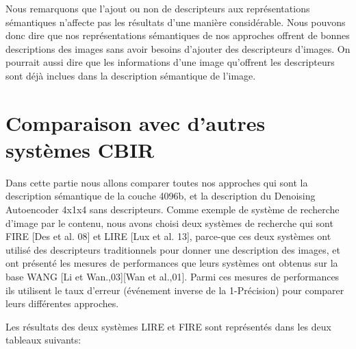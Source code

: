	Nous remarquons que l'ajout ou non de descripteurs aux représentations sémantiques n'affecte pas les résultats d'une manière considérable. Nous pouvons donc dire que nos représentations sémantiques de nos approches offrent de bonnes descriptions des images sans avoir besoins d'ajouter des descripteurs d'images.
On pourrait aussi dire que les informations d'une image qu'offrent les descripteurs sont déjà inclues dans la description sémantique de l'image.

\section{Comparaison avec d'autres systèmes CBIR}

	Dans cette partie nous allons comparer toutes nos approches qui sont la description sémantique de la couche 4096b, et la description du Denoising Autoencoder 4x1x4 sans descripteurs. Comme exemple de système de recherche d'image par le contenu, nous avons choisi deux systèmes de recherche qui sont FIRE [Des et al. 08] et LIRE [Lux et al. 13], parce-que ces deux systèmes ont utilisé des descripteurs traditionnels pour donner une description des images, et ont présenté les mesures de performances que leurs systèmes ont obtenus sur la base WANG [Li et Wan.,03][Wan et al.,01]. Parmi ces mesures de performances ils utilisent le taux d'erreur (événement inverse de la 1-Précision) pour comparer leurs différentes approches.
	
	Les résultats des deux systèmes LIRE et FIRE sont représentés dans les deux tableaux suivants:
	
